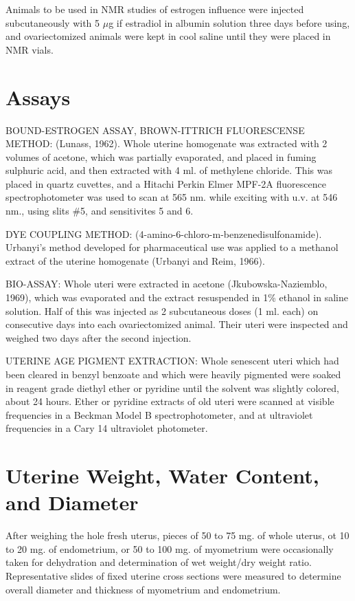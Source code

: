 Animals to be used in NMR studies of estrogen influence were injected subcutaneously with 5 $\mu$g if estradiol in albumin solution three days before using, and ovariectomized animals were
kept in cool saline until they were placed in NMR vials.

\section{Assays}
BOUND-ESTROGEN ASSAY, BROWN-ITTRICH FLUORESCENSE METHOD: (Lunass, 1962). Whole uterine homogenate was extracted with 2 volumes of acetone, which was partially evaporated, and placed in
fuming sulphuric acid, and then extracted with 4 ml. of methylene chloride. This was placed in quartz cuvettes, and a Hitachi Perkin Elmer MPF-2A fluorescence spectrophotometer was used to scan
at 565 nm. while exciting with u.v. at 546 nm., using slits \#5, and sensitivites 5 and 6.

DYE COUPLING METHOD: (4-amino-6-chloro-m-benzenedisulfonamide). Urbanyi's method developed for pharmaceutical use was applied to a methanol extract of the uterine homogenate (Urbanyi and Reim, 1966).

BIO-ASSAY: Whole uteri were extracted in acetone (Jkubowska-Naziemblo, 1969), which was evaporated and the extract resuspended in 1\% ethanol in saline solution. Half of this was injected as 2
subcutaneous doses (1 ml. each) on consecutive days into each ovariectomized animal. Their uteri were inspected and weighed two days after the second injection.

UTERINE AGE PIGMENT EXTRACTION: Whole senescent uteri which had been cleared in benzyl benzoate and which were heavily pigmented were soaked in reagent grade diethyl ether or pyridine until
the solvent was slightly colored, about 24 hours. Ether or pyridine extracts of old uteri were scanned at visible frequencies in a Beckman Model B spectrophotometer, and at ultraviolet frequencies
in a Cary 14 ultraviolet photometer.

\section{Uterine Weight, Water Content, and Diameter}

After weighing the hole fresh uterus, pieces of 50 to 75 mg. of whole uterus, ot 10 to 20 mg. of endometrium, or 50 to 100 mg. of myometrium were
occasionally taken for dehydration and determination of wet weight/dry weight ratio. Representative slides of fixed uterine cross sections were measured to determine
overall diameter and thickness of myometrium and endometrium.


